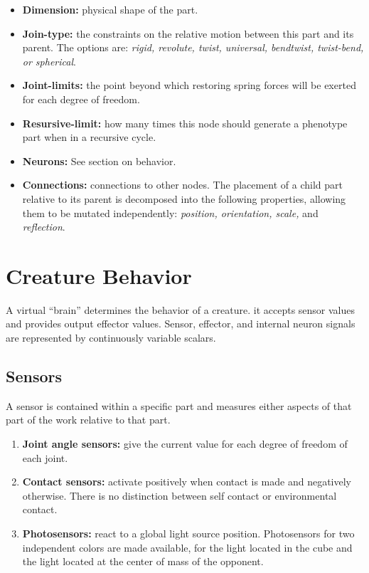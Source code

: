 \documentclass[../main.tex]{subfiles}
\begin{document}
\begin{itemize}
	\item \textbf{Dimension:} physical shape of the part.
	\item \textbf{Join-type:}  the constraints on the relative motion between this part and its parent. The options
	are: \emph{rigid, revolute, twist, universal, bendtwist, twist-bend, or spherical}.
	\item \textbf{Joint-limits:} the point beyond which restoring spring forces will be exerted for each degree of
	freedom.
	\item \textbf{Resursive-limit:}  how many times this node should generate a phenotype part when in a recursive
	cycle.
	\item \textbf{Neurons:} See section on behavior.
	\item \textbf{Connections:} connections to other nodes.  The placement of a child part relative to its parent is
	decomposed into the following properties, allowing them to be mutated independently: \emph{position, orientation,
	scale,} and \emph{reflection}.
\end{itemize}

\section{Creature Behavior}

A virtual ``brain'' determines the behavior of a creature. it accepts sensor values and provides output effector
values. Sensor, effector, and internal neuron signals are represented by continuously variable scalars.

\subsection{Sensors}
A sensor is contained within a specific part and measures either aspects of that part of the work relative to that
part.

\begin{enumerate}
	\item \textbf{Joint angle sensors:} give the current value for each degree of freedom of each joint.
	\item \textbf{Contact sensors:} activate positively when contact is made and negatively otherwise. There is no
	distinction between self contact or environmental contact.
	\item \textbf{Photosensors:}  react to a global light source position. Photosensors for two independent colors are
	made available, for the light located in the cube and the light located at the center of mass of the opponent.
\end{enumerate}
\end{document}
